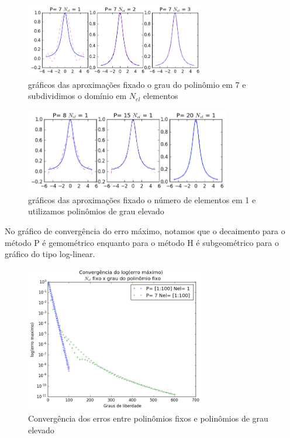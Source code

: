 \begin{figure}[H]
\centering
\includegraphics[width=0.7\textwidth,center]{figuras/interp_usando_FEM.png}
\caption{gráficos das aproximações fixado o grau do polinômio em 7 e subdividimos o domínio em $N_{el}$ elementos }
\end{figure}

\begin{figure}[H]
  \includegraphics[width=0.8\textwidth,center]{figuras/interp_usando_FEMfixo.png}
  \caption{gráficos das aproximações fixado o número de elementos em 1 e utilizamos polinômios de grau elevado}
\end{figure}
 No gráfico de convergência do erro máximo, notamos que o decaimento para o método P é gemométrico enquanto para o método H é subgeométrico para o gráfico do tipo log-linear.
 \begin{figure}[H]
  \includegraphics[width=0.7\textwidth,center]{figuras/convergencia_erro_FEM2.png}
  \caption{Convergência dos erros entre polinômios fixos e polinômios de grau elevado}
\end{figure}

